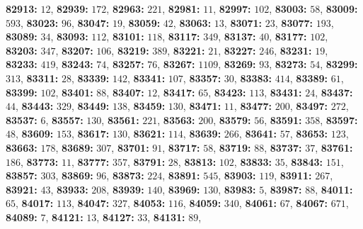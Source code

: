 \textsf{\bfseries 82913:} $12$, \textsf{\bfseries 82939:} $172$, \textsf{\bfseries 82963:} $221$, \textsf{\bfseries 82981:} $11$, \textsf{\bfseries 82997:} $102$, \textsf{\bfseries 83003:} $58$, \textsf{\bfseries 83009:} $593$, \textsf{\bfseries 83023:} $96$, \textsf{\bfseries 83047:} $19$, \textsf{\bfseries 83059:} $42$, \textsf{\bfseries 83063:} $13$, \textsf{\bfseries 83071:} $23$, \textsf{\bfseries 83077:} $193$, \textsf{\bfseries 83089:} $34$, \textsf{\bfseries 83093:} $112$, \textsf{\bfseries 83101:} $118$, \textsf{\bfseries 83117:} $349$, \textsf{\bfseries 83137:} $40$, \textsf{\bfseries 83177:} $102$, \textsf{\bfseries 83203:} $347$, \textsf{\bfseries 83207:} $106$, \textsf{\bfseries 83219:} $389$, \textsf{\bfseries 83221:} $21$, \textsf{\bfseries 83227:} $246$, \textsf{\bfseries 83231:} $19$, \textsf{\bfseries 83233:} $419$, \textsf{\bfseries 83243:} $74$, \textsf{\bfseries 83257:} $76$, \textsf{\bfseries 83267:} $1109$, \textsf{\bfseries 83269:} $93$, \textsf{\bfseries 83273:} $54$, \textsf{\bfseries 83299:} $313$, \textsf{\bfseries 83311:} $28$, \textsf{\bfseries 83339:} $142$, \textsf{\bfseries 83341:} $107$, \textsf{\bfseries 83357:} $30$, \textsf{\bfseries 83383:} $414$, \textsf{\bfseries 83389:} $61$, \textsf{\bfseries 83399:} $102$, \textsf{\bfseries 83401:} $88$, \textsf{\bfseries 83407:} $12$, \textsf{\bfseries 83417:} $65$, \textsf{\bfseries 83423:} $113$, \textsf{\bfseries 83431:} $24$, \textsf{\bfseries 83437:} $44$, \textsf{\bfseries 83443:} $329$, \textsf{\bfseries 83449:} $138$, \textsf{\bfseries 83459:} $130$, \textsf{\bfseries 83471:} $11$, \textsf{\bfseries 83477:} $200$, \textsf{\bfseries 83497:} $272$, \textsf{\bfseries 83537:} $6$, \textsf{\bfseries 83557:} $130$, \textsf{\bfseries 83561:} $221$, \textsf{\bfseries 83563:} $200$, \textsf{\bfseries 83579:} $56$, \textsf{\bfseries 83591:} $358$, \textsf{\bfseries 83597:} $48$, \textsf{\bfseries 83609:} $153$, \textsf{\bfseries 83617:} $130$, \textsf{\bfseries 83621:} $114$, \textsf{\bfseries 83639:} $266$, \textsf{\bfseries 83641:} $57$, \textsf{\bfseries 83653:} $123$, \textsf{\bfseries 83663:} $178$, \textsf{\bfseries 83689:} $307$, \textsf{\bfseries 83701:} $91$, \textsf{\bfseries 83717:} $58$, \textsf{\bfseries 83719:} $88$, \textsf{\bfseries 83737:} $37$, \textsf{\bfseries 83761:} $186$, \textsf{\bfseries 83773:} $11$, \textsf{\bfseries 83777:} $357$, \textsf{\bfseries 83791:} $28$, \textsf{\bfseries 83813:} $102$, \textsf{\bfseries 83833:} $35$, \textsf{\bfseries 83843:} $151$, \textsf{\bfseries 83857:} $303$, \textsf{\bfseries 83869:} $96$, \textsf{\bfseries 83873:} $224$, \textsf{\bfseries 83891:} $545$, \textsf{\bfseries 83903:} $119$, \textsf{\bfseries 83911:} $267$, \textsf{\bfseries 83921:} $43$, \textsf{\bfseries 83933:} $208$, \textsf{\bfseries 83939:} $140$, \textsf{\bfseries 83969:} $130$, \textsf{\bfseries 83983:} $5$, \textsf{\bfseries 83987:} $88$, \textsf{\bfseries 84011:} $65$, \textsf{\bfseries 84017:} $113$, \textsf{\bfseries 84047:} $327$, \textsf{\bfseries 84053:} $116$, \textsf{\bfseries 84059:} $340$, \textsf{\bfseries 84061:} $67$, \textsf{\bfseries 84067:} $671$, \textsf{\bfseries 84089:} $7$, \textsf{\bfseries 84121:} $13$, \textsf{\bfseries 84127:} $33$, \textsf{\bfseries 84131:} $89$, 
